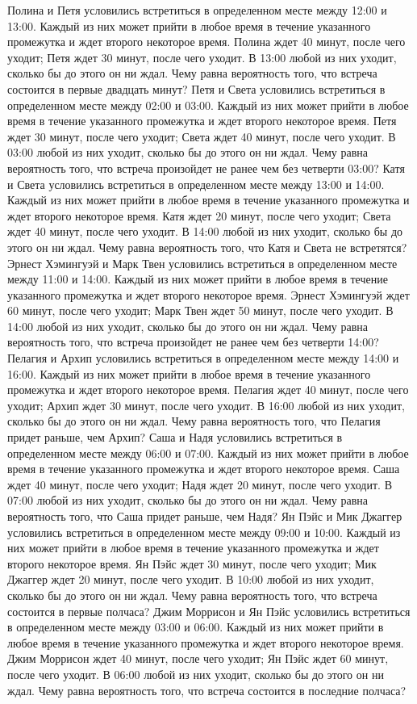 Полина и Петя условились встретиться в определенном месте между 12:00 и 13:00. Каждый из них может прийти в любое время в течение указанного промежутка и ждет второго некоторое время. Полина ждет 40 минут, после чего уходит; Петя ждет 30 минут, после чего уходит. В 13:00 любой из них уходит, сколько бы до этого он ни ждал. Чему равна вероятность того, что встреча состоится в первые двадцать минут?
Петя и Света условились встретиться в определенном месте между 02:00 и 03:00. Каждый из них может прийти в любое время в течение указанного промежутка и ждет второго некоторое время. Петя ждет 30 минут, после чего уходит; Света ждет 40 минут, после чего уходит. В 03:00 любой из них уходит, сколько бы до этого он ни ждал. Чему равна вероятность того, что встреча произойдет не ранее чем без четверти 03:00?
Катя и Света условились встретиться в определенном месте между 13:00 и 14:00. Каждый из них может прийти в любое время в течение указанного промежутка и ждет второго некоторое время. Катя ждет 20 минут, после чего уходит; Света ждет 40 минут, после чего уходит. В 14:00 любой из них уходит, сколько бы до этого он ни ждал. Чему равна вероятность того, что Катя и Света не встретятся?
Эрнест Хэмингуэй и Марк Твен условились встретиться в определенном месте между 11:00 и 14:00. Каждый из них может прийти в любое время в течение указанного промежутка и ждет второго некоторое время. Эрнест Хэмингуэй ждет 60 минут, после чего уходит; Марк Твен ждет 50 минут, после чего уходит. В 14:00 любой из них уходит, сколько бы до этого он ни ждал. Чему равна вероятность того, что встреча произойдет не ранее чем без четверти 14:00?
Пелагия и Архип условились встретиться в определенном месте между 14:00 и 16:00. Каждый из них может прийти в любое время в течение указанного промежутка и ждет второго некоторое время. Пелагия ждет 40 минут, после чего уходит; Архип ждет 30 минут, после чего уходит. В 16:00 любой из них уходит, сколько бы до этого он ни ждал. Чему равна вероятность того, что Пелагия придет раньше, чем Архип?
Саша и Надя условились встретиться в определенном месте между 06:00 и 07:00. Каждый из них может прийти в любое время в течение указанного промежутка и ждет второго некоторое время. Саша ждет 40 минут, после чего уходит; Надя ждет 20 минут, после чего уходит. В 07:00 любой из них уходит, сколько бы до этого он ни ждал. Чему равна вероятность того, что Саша придет раньше, чем Надя?
Ян Пэйс и Мик Джаггер условились встретиться в определенном месте между 09:00 и 10:00. Каждый из них может прийти в любое время в течение указанного промежутка и ждет второго некоторое время. Ян Пэйс ждет 30 минут, после чего уходит; Мик Джаггер ждет 20 минут, после чего уходит. В 10:00 любой из них уходит, сколько бы до этого он ни ждал. Чему равна вероятность того, что встреча состоится в первые полчаса?
Джим Моррисон и Ян Пэйс условились встретиться в определенном месте между 03:00 и 06:00. Каждый из них может прийти в любое время в течение указанного промежутка и ждет второго некоторое время. Джим Моррисон ждет 40 минут, после чего уходит; Ян Пэйс ждет 60 минут, после чего уходит. В 06:00 любой из них уходит, сколько бы до этого он ни ждал. Чему равна вероятность того, что встреча состоится в последние полчаса?
